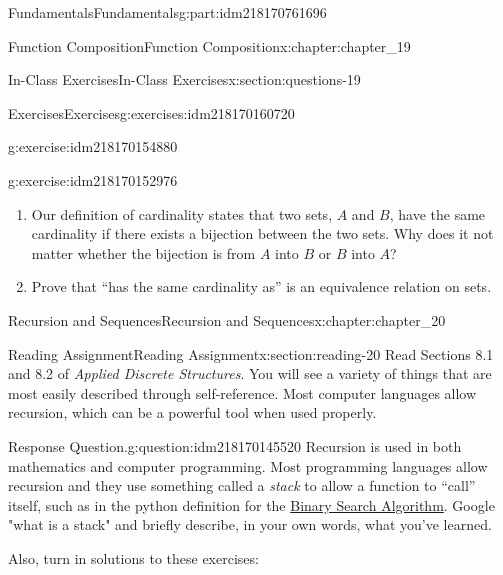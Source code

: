 \documentclass[oneside,10pt,]{book}
\numberwithin{equation}{section}
\begin{document}
\begin{partptx}{Fundamentals}{}{Fundamentals}{}{}{g:part:idm218170761696}
\begin{chapterptx}{Function Composition}{}{Function Composition}{}{}{x:chapter:chapter_19}
\begin{sectionptx}{In-Class Exercises}{}{In-Class Exercises}{}{}{x:section:questions-19}
\begin{exercises-subsection-numberless}{Exercises}{}{Exercises}{}{}{g:exercises:idm218170160720}
\begin{exercisegroup}
\begin{divisionexerciseeg}{3}{}{}{g:exercise:idm218170154880}
\end{divisionexerciseeg}%
\begin{divisionexerciseeg}{4}{}{}{g:exercise:idm218170152976}%
%
\begin{enumerate}[label=(\alph*)]
\item{}Our definition of cardinality states that two sets, \(A\) and \(B\), have the same cardinality if there exists a bijection between the two sets. Why does it not matter whether the bijection is from \(A\) into \(B\) or \(B\) into \(A\)?%
\item{}Prove that ``has the same cardinality as'' is an equivalence relation on sets.%
\end{enumerate}
%
\end{divisionexerciseeg}%
\end{exercisegroup}
\par\medskip\noindent
\end{exercises-subsection-numberless}
\end{sectionptx}
\end{chapterptx}
%
\typeout{************************************************}
\typeout{************************************************}
%
\begin{chapterptx}{Recursion and Sequences}{}{Recursion and Sequences}{}{}{x:chapter:chapter_20}
%
%
%
%
\typeout{************************************************}
\typeout{************************************************}
%
\begin{sectionptx}{Reading Assignment}{}{Reading Assignment}{}{}{x:section:reading-20}
Read  Sections 8.1 and 8.2 of \emph{Applied Discrete Structures}.  You will see a variety of things that are most easily described through self-reference.  Most computer languages allow recursion, which can be a powerful tool when used properly.%
\begin{question}{Response Question.}{g:question:idm218170145520}%
Recursion is used in both mathematics and computer programming. Most programming languages allow recursion and they use something called a \emph{stack} to allow a function to ``call'' itself, such as in the python definition for the \hyperref[x:section:s-bsa]{Binary Search Algorithm}.  Google "what is a stack" and briefly describe, in your own words, what you've learned.%
\end{question}
Also, turn in solutions to these exercises:%
%
%
\typeout{************************************************}

\end{sectionptx}
\end{chapterptx}
\end{partptx}
\end{document}
